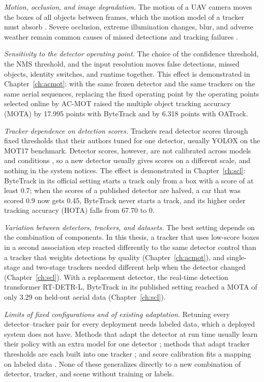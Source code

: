 \emph{Motion, occlusion, and image degradation.} The motion of a UAV camera moves the boxes of all objects between frames, which the motion model of a tracker must absorb \cite{liu2022uavmot}. Severe occlusion, extreme illumination changes, blur, and adverse weather remain common causes of missed detections and tracking failures \cite{ismail2026realtime,chae2024radar}.

\emph{Sensitivity to the detector operating point.} The choice of the confidence threshold, the NMS threshold, and the input resolution moves false detections, missed objects, identity switches, and runtime together. This effect is demonstrated in Chapter~\ref{ch:acmot}: with the same frozen detector and the same trackers on the same aerial sequences, replacing the fixed operating point by the operating points selected online by AC-MOT raised the multiple object tracking accuracy (MOTA) by 17.995 points with ByteTrack and by 6.318 points with OATrack.

\emph{Tracker dependence on detection scores.} Trackers read detector scores through fixed thresholds that their authors tuned for one detector, usually YOLOX \cite{ge2021yolox} on the MOT17 benchmark. Detector scores, however, are not calibrated across models and conditions \cite{guo2017calibration,kuppers2020detcalib}, so a new detector usually gives scores on a different scale, and nothing in the system notices. The effect is demonstrated in Chapter~\ref{ch:scl}: ByteTrack in its official setting starts a track only from a box with a score of at least 0.7; when the scores of a published detector are halved, a car that was scored 0.9 now gets 0.45, ByteTrack never starts a track, and its higher order tracking accuracy (HOTA) \cite{luiten2021hota} falls from 67.70 to 0.

\emph{Variation between detectors, trackers, and datasets.} The best setting depends on the combination of components. In this thesis, a tracker that uses low-score boxes in a second association step reacted differently to the same detector control than a tracker that weights detections by quality (Chapter~\ref{ch:acmot}), and single-stage and two-stage trackers needed different help when the detector changed (Chapter~\ref{ch:scl}). With a replacement detector, the real-time detection transformer RT-DETR-L, ByteTrack in its published setting reached a MOTA of only 3.29 on held-out aerial data (Chapter~\ref{ch:scl}).

\emph{Limits of fixed configurations and of existing adaptation.} Retuning every detector--tracker pair for every deployment needs labeled data, which a deployed system does not have. Methods that adapt the detector at run time usually learn their policy with an extra model for one detector \cite{han2022dynamic,chin2019adascale,xu2020approxdet}; methods that adapt tracker thresholds are each built into one tracker \cite{ma2023adaptivebytetrack,shim2024adaptrack,act2026adaptive}; and score calibration fits a mapping on labeled data \cite{kuppers2020detcalib}. None of these generalizes directly to a new combination of detector, tracker, and scene without training or labels.

